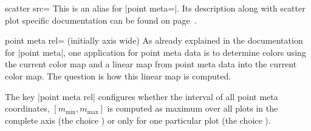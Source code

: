 \begin{pgfplotskey}{scatter src=}
	This is an alias for |point meta=|. Its description along with scatter plot specific documentation can be found on page~\pageref{pgfplots:scatter:src}.
\end{pgfplotskey}

\begin{pgfplotskey}{point meta rel= (initially axis wide)}
	As already explained in the documentation for |point meta|, one application for point meta data is to determine colors using the current color map and a linear map from point meta data into the current color map. The question is how this linear map is computed. 

	The key |point meta rel| configures whether the interval of all point meta coordinates, $[m_{\text{min}},m_{\text{max}}]$ is computed as maximum over all plots in the complete axis (the choice ) or only for one particular plot (the choice ).

\begin{codeexample}[]
~
\end{codeexample}
\end{pgfplotskey}

